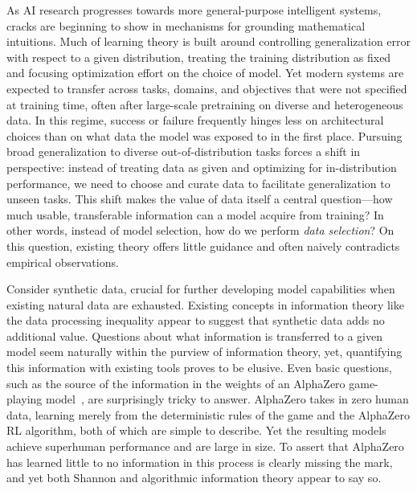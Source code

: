 \documentclass[twoside]{article}
\begin{document}
%
%
%
%

%
%
%
%
%

%
%
%
%
%
%
%
%



As AI research progresses towards more general-purpose intelligent systems, cracks are beginning to show in mechanisms for grounding mathematical intuitions. 
Much of learning theory is built around controlling generalization error with respect to a given distribution, treating the training distribution as fixed and focusing optimization effort on the choice of model. Yet modern systems are expected to transfer across tasks, domains, and objectives that were not specified at training time, often after large-scale pretraining on diverse and heterogeneous data. In this regime, success or failure frequently hinges less on architectural choices than on what data the model was exposed to in the first place.
Pursuing broad generalization to diverse out-of-distribution tasks forces a shift in perspective: instead of treating data as given and optimizing for in-distribution performance, we need to choose and curate data to facilitate generalization to unseen tasks. %
This shift makes the value of data itself a central question---how much usable, transferable information can a model acquire from training? In other words, instead of model selection, how do we perform \emph{data selection}? On this question, existing theory offers little guidance and often naively contradicts empirical observations.
%


Consider synthetic data, crucial for further developing model capabilities \citep{abdin2024phi, maini2024rephrasing} when existing natural data are exhausted. Existing concepts in 
information theory like the data processing inequality appear 
to suggest that synthetic data adds no additional value.
Questions about what information is transferred to a given model seem naturally within the purview of information theory, yet, quantifying this information with existing tools proves to be elusive. 
Even basic questions, such as the source of the information in the weights of an AlphaZero game-playing model~\citep{silver2018general}, are surprisingly tricky to answer. AlphaZero takes in zero human data, learning merely from the deterministic rules of the game and the AlphaZero RL algorithm, both of which are simple to describe. Yet the resulting models achieve superhuman performance and are large in size.
To assert that AlphaZero has learned little to no information in this process is clearly missing the mark, and yet both Shannon and algorithmic information theory appear to say so.
%
%
\end{document}
